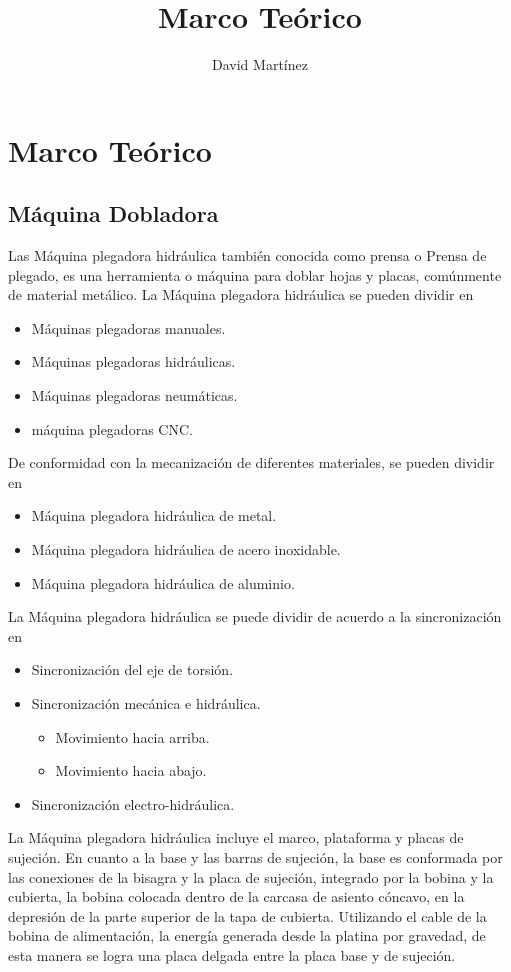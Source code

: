 \documentclass[12pt,graphicx,caption,rotating]{article}
\title{Marco Teórico}
\author{David Martínez}
\date{}
\begin{document}
\maketitle

\tableofcontents
\newpage
\section{Marco Teórico}
\subsection{Máquina Dobladora}
\noindent
Las Máquina plegadora hidráulica también conocida como prensa o Prensa de plegado, es una herramienta o máquina para doblar hojas y placas, comúnmente de material metálico. La Máquina plegadora hidráulica se pueden dividir en
\begin{itemize}
 \item Máquinas plegadoras manuales.
 \item Máquinas plegadoras hidráulicas.
 \item Máquinas plegadoras neumáticas.
 \item máquina plegadoras CNC.
\end{itemize}
\noindent
De conformidad con la mecanización de diferentes materiales, se pueden dividir en
\begin{itemize}
 \item Máquina plegadora hidráulica de metal.
 \item Máquina plegadora hidráulica de acero inoxidable.
 \item Máquina plegadora hidráulica de aluminio.
\end{itemize}
\noindent
La Máquina plegadora hidráulica se puede dividir de acuerdo a la sincronización en
\begin{itemize}
 \item Sincronización del eje de torsión.
 \item Sincronización mecánica e hidráulica.
 \begin{itemize}
  \item Movimiento hacia arriba.
  \item Movimiento hacia abajo.
 \end{itemize}
 \item Sincronización electro-hidráulica.
\end{itemize}
\noindent
La Máquina plegadora hidráulica incluye el marco, plataforma y placas de sujeción. En cuanto a la base y las barras de sujeción, la base es conformada por las conexiones de la bisagra y la placa de sujeción, integrado por la bobina y la cubierta, la bobina colocada dentro de la carcasa de asiento cóncavo, en la depresión de la parte superior de la tapa de cubierta. Utilizando el cable de la bobina de alimentación, la energía generada desde la platina por gravedad, de esta manera se logra una placa delgada entre la placa base y de sujeción.\\
\end{document}
